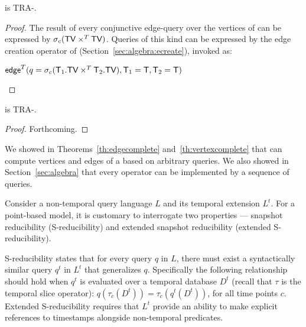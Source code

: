 \begin{theorem}
\tga is TRA-\edgec.
\label{th:edgecomplete}
\end{theorem}

\begin{proof}
  The result of every conjunctive edge-query over the vertices of \ttt
  can be expressed by $\sigma_{c} (\textsf{TV} \times^T \textsf{TV})$.  Queries of
  this kind can be expressed by the edge creation operator of \tga
  (Section~\ref{sec:algebra:ecreate}), invoked as:
\begin{center}
  $\textsf{edge}^T(q=\sigma_{c} (\mathsf{T}_1.\textsf{TV} \times^T \mathsf{T}_2.\textsf{TV}),\mathsf{T}_1   = \mathsf{T},\mathsf{T}_2=\mathsf{T})$
\end{center}
\end{proof}



\begin{theorem}
\tga is TRA-\vertexc.
\label{th:vertexcomplete}
\end{theorem}

\begin{proof}  Forthcoming.
\end{proof}

We showed in Theorems~\ref{th:edgecomplete}
and~\ref{th:vertexcomplete} that \ql can compute vertices and edges of
a \tg based on arbitrary \tra queries.  We also showed in
Section~\ref{sec:algebra} that every \ql operator can be implemented
by a sequence of \tra queries.

Consider a non-temporal query language $L$ and its temporal extension
$L^t$.  For a point-based model, it is customary to interrogate two
properties --- snapshot reducibility (S-reducibility) and extended
snapshot reducibility (extended S-reducibility).

S-reducibility states that for every query $q$ in $L$, there must
exist a syntactically similar query $q^t$ in $L^t$ that generalizes
$q$.  Specifically the following relationship should hold when $q^t$
is evaluated over a temporal database $D^t$ (recall that $\tau$ is the
temporal slice operator): $q(\tau_c(D^t)) = \tau_c(q^t(D^t))$, for all
time points $c$.  Extended S-reducibility requires that $L^t$ provide
an ability to make explicit references to timestamps alongside
non-temporal predicates.

